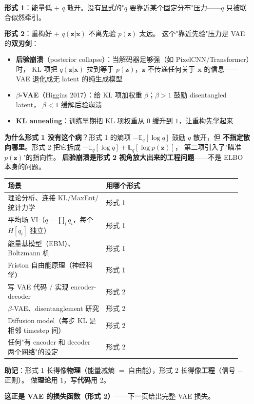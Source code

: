 \documentclass[12pt, a4paper]{ctexart}
\begin{document}
\begin{blackboard}[形式 1 vs 形式 2：优化时的行为差异]

\textbf{形式 1}：能量低 $+$ $q$ 散开。没有显式的"$q$ 要靠近某个固定分布"压力——$q$ 只被联合似然牵引。

\textbf{形式 2}：重构好 $+$ $q(\mathbf{z}|\mathbf{x})$ 不离先验 $p(\mathbf{z})$ 太远。
这个"靠近先验"压力是 VAE 的\textbf{双刃剑}：
\begin{itemize}
    \item \textbf{后验崩溃}（posterior collapse）：当解码器足够强（如 PixelCNN/Transformer）时，
    KL 项把 $q(\mathbf{z}|\mathbf{x})$ 拉到等于 $p(\mathbf{z})$，$\mathbf{z}$ 不传递任何关于 $\mathbf{x}$ 的信息——
    VAE 退化成无 latent 的纯生成模型
    \item $\beta$\textbf{-VAE}（Higgins 2017）：给 KL 项加权重 $\beta$；$\beta > 1$ 鼓励 disentangled latent，
    $\beta < 1$ 缓解后验崩溃
    \item \textbf{KL annealing}：训练早期把 KL 项权重从 $0$ 缓升到 $1$，让重构先学起来
\end{itemize}

\textbf{为什么形式 1 没有这个病}？形式 1 的熵项 $-\mathbb{E}_q[\log q]$ 鼓励 $q$ 散开，但
\textbf{不指定散向哪里}。形式 2 把它拆成 $-\mathbb{E}_q[\log q] + \mathbb{E}_q[\log p(\mathbf{z})]$，
第二项引入了"瞄准 $p(\mathbf{z})$"的指向性。
\textbf{后验崩溃是形式 2 视角放大出来的工程问题}——不是 ELBO 本身的问题。

\end{blackboard}

\begin{keypoint}[选哪个？]

\renewcommand{\arraystretch}{1.15}
\begin{tabular}{p{0.40\linewidth}|p{0.55\linewidth}}
\toprule
\textbf{场景} & \textbf{用哪个形式} \\
\midrule
理论分析、连接 KL/MaxEnt/统计力学 & 形式 1 \\
平均场 VI（$q = \prod_i q_i$，每个 $H[q_i]$ 独立） & 形式 1 \\
能量基模型（EBM）、Boltzmann 机 & 形式 1 \\
Friston 自由能原理（神经科学） & 形式 1 \\
\midrule
写 VAE 代码 / 实现 encoder-decoder & 形式 2 \\
$\beta$-VAE、disentanglement 研究 & 形式 2 \\
Diffusion model（每步 KL 是相邻 timestep 间） & 形式 2 \\
任何"有 encoder 和 decoder 两个网络"的设定 & 形式 2 \\
\bottomrule
\end{tabular}

\vspace{0.5em}
\textbf{助记}：形式 1 长得像\textbf{物理}（能量减熵 $=$ 自由能），形式 2 长得像\textbf{工程}（信号 $-$ 正则）。
做\textbf{理论}用 1，写\textbf{代码}用 2。

\textbf{这正是 VAE 的损失函数（形式 2）}——下一页给出完整 VAE 损失。

\end{keypoint}
\end{document}
